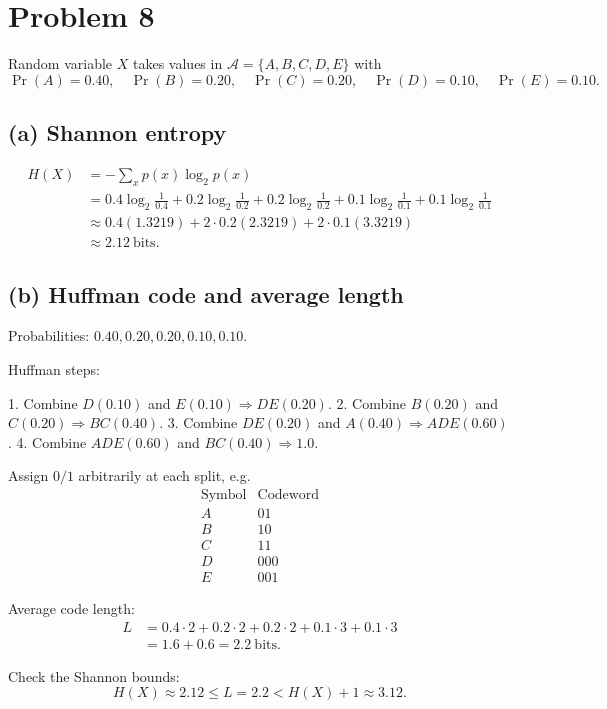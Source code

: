 \section*{Problem 8}

Random variable \(X\) takes values in \(\mathcal{A}=\{A,B,C,D,E\}\) with
\[
\Pr(A)=0.40,\quad
\Pr(B)=0.20,\quad
\Pr(C)=0.20,\quad
\Pr(D)=0.10,\quad
\Pr(E)=0.10.
\]

\subsection*{(a) Shannon entropy}

\[
\begin{aligned}
H(X) &= -\sum_{x} p(x)\log_2 p(x) \\
&= 0.4\log_2\frac{1}{0.4}
  + 0.2\log_2\frac{1}{0.2}
  + 0.2\log_2\frac{1}{0.2}
  + 0.1\log_2\frac{1}{0.1}
  + 0.1\log_2\frac{1}{0.1}\\
&\approx 0.4(1.3219)+2\cdot 0.2(2.3219)+2\cdot 0.1(3.3219)\\
&\approx 2.12\ \text{bits}.
\end{aligned}
\]

\subsection*{(b) Huffman code and average length}

Probabilities: \(0.40,0.20,0.20,0.10,0.10\).

Huffman steps:

1. Combine \(D(0.10)\) and \(E(0.10)\Rightarrow DE(0.20)\).
2. Combine \(B(0.20)\) and \(C(0.20)\Rightarrow BC(0.40)\).
3. Combine \(DE(0.20)\) and \(A(0.40)\Rightarrow ADE(0.60)\).
4. Combine \(ADE(0.60)\) and \(BC(0.40)\Rightarrow 1.0\).

Assign \(0/1\) arbitrarily at each split, e.g.
\[
\begin{array}{c|c}
\text{Symbol} & \text{Codeword} \\ \hline
A & 01\\
B & 10\\
C & 11\\
D & 000\\
E & 001
\end{array}
\]

Average code length:
\[
\begin{aligned}
L &= 0.4\cdot 2 + 0.2\cdot 2 + 0.2\cdot 2 + 0.1\cdot 3 + 0.1\cdot 3 \\
  &= 1.6 + 0.6 = 2.2\ \text{bits}.
\end{aligned}
\]

Check the Shannon bounds:
\[
H(X)\approx 2.12 \le L = 2.2 < H(X)+1 \approx 3.12.
\]
